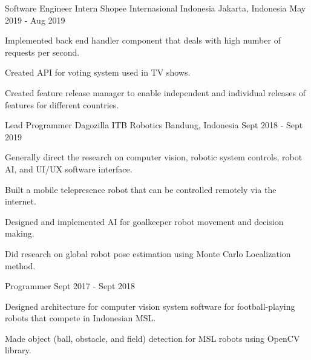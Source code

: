 

\begin{cventries}

  \cventry
    {Software Engineer Intern} %
    {Shopee Internasional Indonesia} %
    {Jakarta, Indonesia} %
    {May 2019 - Aug 2019} %
    {
      \begin{cvitems} %
        \item {Implemented back end handler component that deals with high number of requests per second.}
        \item {Created API for voting system used in TV shows.}
        \item {Created feature release manager to enable independent and individual releases of features for different countries.}
      \end{cvitems}
    }


  \cventry
	{Lead Programmer} %
	{Dagozilla ITB Robotics} %
	{Bandung, Indonesia} %
	{Sept 2018 - Sept 2019} %
	{
	  \begin{cvitems} %
		\item {Generally direct the research on computer vision, robotic system controls, robot AI, and UI/UX software interface.}
		\item {Built a mobile telepresence robot that can be controlled remotely via the internet.}
		\item {Designed and implemented AI for goalkeeper robot movement and decision making.}
		\item {Did research on global robot pose estimation using Monte Carlo Localization method.}
	  \end{cvitems}
	}


  \cventry
	{Programmer} %
	{} %
	{} %
	{Sept 2017 - Sept 2018} %
	{
	  \begin{cvitems} %
		\item {Designed architecture for computer vision system software for football-playing robots that compete in Indonesian MSL.}
		\item {Made object (ball, obstacle, and field) detection for MSL robots using OpenCV library.}
	  \end{cvitems}
	}
\end{cventries}

